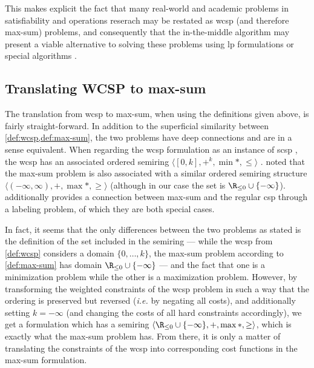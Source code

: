 This makes explicit the fact that many real-world and academic problems in satisfiability and operations reserach may be restated as \gls{wcsp} (and therefore max-sum) problems, and consequently that the in-the-middle algorithm may present a viable alternative to solving these problems using \gls{lp} formulations \parencites{Ansotegui13a}{Davies13} or special algorithms \parencites{Ansotegui13b}{Larrosa08}.


\subsection{Translating WCSP to max-sum}
The translation from \gls{wcsp} to max-sum, when using the definitions given above, is fairly straight-forward.
In addition to the superficial similarity between \cref{def:wcsp,def:max-sum}, the two problems have deep connections and are in a sense equivalent.
When regarding the \gls{wcsp} formulation as an instance of \gls{scsp} \parencite[\pno~285\psq]{Meseguer06}, the \gls{wcsp} has an associated ordered semiring \(\langle [0,k],+^k,\min*,\leq\rangle\) \parencite[\pno~290]{Meseguer06}.
\Textcite[\pno~1167]{Werner07} noted that the max-sum problem is also associated with a similar ordered semiring structure \(\langle (-\infty,\infty),+,\max*,\geq\rangle\) (although in our case the set is \(\Rminus \cup \{-\infty\}\)).
 additionally provides a connection between max-sum and the regular \gls{csp} through a labeling problem, of which they are both special cases.

In fact, it seems that the only differences between the two problems as stated is the definition of the set included in the semiring --- while the \gls{wcsp} from \cref{def:wcsp} considers a domain \(\{0,\dotsc,k\}\), the max-sum problem according to \cref{def:max-sum} has domain \(\Rminus \cup \{-\infty\}\) --- and the fact that one is a minimization problem while the other is a maximization problem.
However, by transforming the weighted constraints of the \gls{wcsp} problem in such a way that the ordering is preserved but reversed (\emph{i.e.} by negating all costs), and additionally setting \(k=-\infty\) (and changing the costs of all hard constraints accordingly), we get a formulation which has a semiring \(\langle\Rminus \cup \{-\infty\},+,\max*,\geq\rangle\), which is exactly what the max-sum problem has.
From there, it is only a matter of translating the constraints of the \gls{wcsp} into corresponding cost functions in the max-sum formulation.

